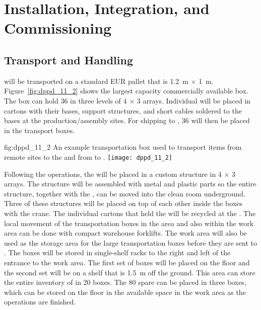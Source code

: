 \section{Installation, Integration, and Commissioning}
\label{sec:dp-pds-installation}

\subsection{Transport and Handling}

 will be transported on a standard EUR pallet that is \SI{1.2}{\m} $\times$ \SI{1}{\m}. Figure~\ref{fig:dppd_11_2} shows the largest capacity commercially available box. The box can hold \num{36}  in three levels of \num{4} $\times$ \num{3} arrays. Individual  will be placed in cartons with their bases, support structures, and short  cables soldered to the bases at the production/assembly sites. For shipping to , \num{36}  will then be placed in the transport boxes.

\begin{dunefigure}{fig:dppd_11_2}
{An example transportation box used to transport items from remote sites to the  and from  to \surf.}
\texttt{[image: dppd\_11\_2]}
\end{dunefigure}

Following the  operations, the  will be placed in a custom structure in \num{4} $\times$ \num{3} arrays. The structure will be assembled with metal and plastic parts so the entire structure, together with the , can be moved into the clean room underground. Three of these structures will be placed on top of each other inside the boxes with the crane. The individual cartons that held the  will be recycled at the . The local movement of the transportation boxes in the  area and also within the \dual {} work area can be done with compact warehouse forklifts. The  work area will also be used as the storage area for the large  transportation boxes before they are sent to \surf. The boxes will be stored in single-shelf racks to the right and left of the entrance to the work area. The first set of boxes will be placed on the floor and the second set will be on a shelf that is \SI{1.5}{\m} off the ground. This area can store the entire \dual {}  inventory of \dpnumpmtch {} in \num{20} boxes. The \num{80} spare  can be placed in three boxes, which can be stored on the floor in the available space in the work area as the \dual {}  operations are finished.

